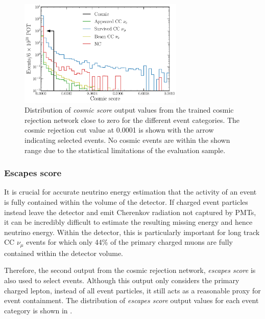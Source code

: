 \begin{figure} %
    \includegraphics[width=0.7\textwidth]{diagrams/7-results/final_cosmic_zoomed_outputs.pdf}
    \caption[Distribution of cosmic score output values close to zero]
    {Distribution of \emph{cosmic score} output values from the trained cosmic rejection network
        close to zero for the different event categories. The cosmic rejection cut value at 0.0001
        is shown with the arrow indicating selected events. No cosmic events are within the shown
        range due to the statistical limitations of the evaluation sample.}
    \label{fig:cosmic_zoomed_outputs}
\end{figure}

\subsubsection*{Escapes score} %

It is crucial for accurate neutrino energy estimation that the activity of an event is fully
contained within the volume of the detector. If charged event particles instead leave the detector
and emit Cherenkov radiation not captured by PMTs, it can be incredibly difficult to estimate the
resulting missing energy and hence neutrino energy. Within the \chipsfive detector, this is
particularly important for long track CC $\nu_{\mu}$ events for which only 44\% of the primary
charged muons are fully contained within the detector volume.

Therefore, the second output from the cosmic rejection network, \emph{escapes score} is also used
to select events. Although this output only considers the primary charged lepton, instead of all
event particles, it still acts as a reasonable proxy for event containment. The distribution of
\emph{escapes score} output values for each event category is shown in
.

